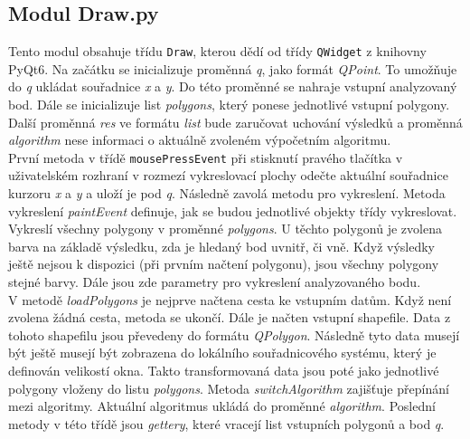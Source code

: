 \documentclass{article}
\begin{document}
\subsection{\small{Modul Draw.py}}
Tento modul obsahuje třídu \texttt{Draw}, kterou dědí od třídy \texttt{QWidget} z knihovny PyQt6. Na začátku se inicializuje proměnná \emph{q}, jako formát \emph{QPoint}. To umožňuje do \emph{q} ukládat souřadnice \emph{x} a \emph{y}. Do této proměnné se nahraje vstupní analyzovaný bod. Dále se inicializuje list \emph{polygons}, který ponese jednotlivé vstupní polygony. Další proměnná \emph{res} ve formátu \emph{list} bude zaručovat uchování výsledků a proměnná \emph{algorithm} nese informaci o aktuálně zvoleném výpočetním algoritmu.\\
První metoda v třídě \texttt{mousePressEvent} při stisknutí pravého tlačítka v uživatelském rozhraní v rozmezí vykreslovací plochy odečte aktuální souřadnice kurzoru \emph{x} a \emph{y} a uloží je pod \emph{q}. Následně zavolá metodu pro vykreslení. Metoda vykreslení \emph{paintEvent} definuje, jak se budou jednotlivé objekty třídy vykreslovat. Vykreslí všechny polygony v proměnné \emph{polygons}. U těchto polygonů je zvolena barva na základě výsledku, zda je hledaný bod uvnitř, či vně. Když výsledky ještě nejsou k dispozici (při prvním načtení polygonu), jsou všechny polygony stejné barvy. Dále jsou zde parametry pro vykreslení analyzovaného bodu.\\
V metodě \emph{loadPolygons} je nejprve načtena cesta ke vstupním datům. Když není zvolena žádná cesta, metoda se ukončí. Dále je načten vstupní shapefile. Data z tohoto shapefilu jsou převedeny do formátu \emph{QPolygon}. Následně tyto data musejí být ještě musejí být zobrazena do lokálního souřadnicového systému, který je definován velikostí okna. Takto transformovaná data jsou poté jako jednotlivé polygony vloženy do listu \emph{polygons}. Metoda \emph{switchAlgorithm} zajišťuje přepínání mezi algoritmy. Aktuální algoritmus ukládá do proměnné \emph{algorithm}. Poslední metody v této třídě jsou \emph{gettery}, které vracejí list vstupních polygonů a bod \emph{q}.
\end{document}
